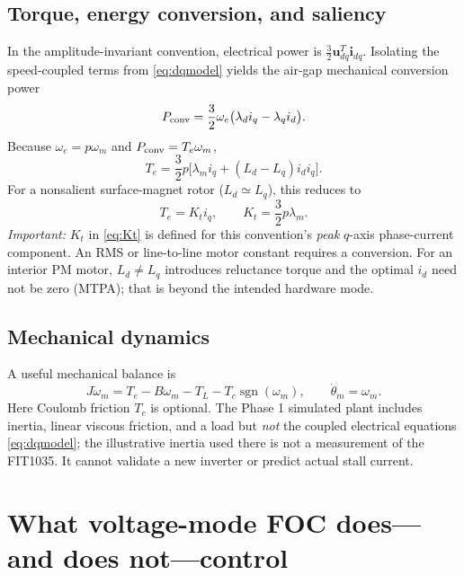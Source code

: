 \documentclass[10pt,letterpaper]{article}
\begin{document}
\subsection{Torque, energy conversion, and saliency}
In the amplitude-invariant convention, electrical power is $\frac32\bm u_{dq}^{\!T}\bm i_{dq}$. Isolating the speed-coupled terms from \eqref{eq:dqmodel} yields the air-gap mechanical conversion power
\begin{equation}
P_{\rm conv}=\frac32\omega_e\bigl(\lambda_di_q-\lambda_qi_d\bigr).
\end{equation}
Because $\omega_e=p\omega_m$ and $P_{\rm conv}=T_e\omega_m$,
\begin{equation}\label{eq:torque}
T_e=\frac32 p\bigl[\lambda_m i_q+(L_d-L_q)i_di_q\bigr].
\end{equation}
For a nonsalient surface-magnet rotor ($L_d\simeq L_q$), this reduces to
\begin{equation}\label{eq:Kt}
T_e=K_t i_q,\qquad K_t=\frac32 p\lambda_m.
\end{equation}
\emph{Important:} $K_t$ in \eqref{eq:Kt} is defined for this convention's \emph{peak} $q$-axis phase-current component. An RMS or line-to-line motor constant requires a conversion. For an interior PM motor, $L_d\ne L_q$ introduces reluctance torque and the optimal $i_d$ need not be zero (MTPA); that is beyond the intended hardware mode.

\subsection{Mechanical dynamics}
A useful mechanical balance is
\begin{equation}\label{eq:mech}
J\dot\omega_m=T_e-B\omega_m-T_L-T_c\operatorname{sgn}(\omega_m),\qquad \dot\theta_m=\omega_m.
\end{equation}
Here Coulomb friction $T_c$ is optional. The Phase 1 simulated plant includes inertia, linear viscous friction, and a load but \emph{not} the coupled electrical equations \eqref{eq:dqmodel}; the illustrative inertia used there is not a measurement of the FIT1035. It cannot validate a new inverter or predict actual stall current.

\section{What voltage-mode FOC does---and does not---control}
\end{document}
